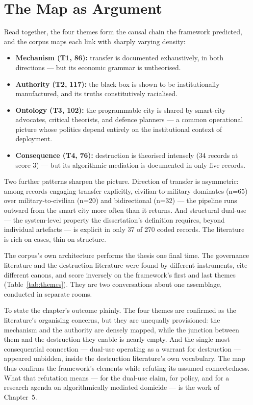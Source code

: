 \section{The Map as Argument}
\label{sec:map-as-argument}

Read together, the four themes form the causal chain the framework predicted, and the corpus maps each link with sharply varying density:

\begin{itemize}
\item \textbf{Mechanism (T1, 86):} transfer is documented exhaustively, in both directions — but its economic grammar is untheorised.
\item \textbf{Authority (T2, 117):} the black box is shown to be institutionally manufactured, and its truths constitutively racialised.
\item \textbf{Ontology (T3, 102):} the programmable city is shared by smart-city advocates, critical theorists, and defence planners — a common operational picture whose politics depend entirely on the institutional context of deployment.
\item \textbf{Consequence (T4, 76):} destruction is theorised intensely (34 records at score 3) — but its algorithmic mediation is documented in only five records.
\end{itemize}

Two further patterns sharpen the picture. Direction of transfer is asymmetric: among records engaging transfer explicitly, civilian-to-military dominates (n=65) over military-to-civilian (n=20) and bidirectional (n=32) — the pipeline runs outward from the smart city more often than it returns. And structural dual-use — the system-level property the dissertation's definition requires, beyond individual artefacts — is explicit in only 37 of 270 coded records. The literature is rich on cases, thin on structure.

The corpus's own architecture performs the thesis one final time. The governance literature and the destruction literature were found by different instruments, cite different canons, and score inversely on the framework's first and last themes (Table~\ref{tab:themes}). They are two conversations about one assemblage, conducted in separate rooms.

To state the chapter's outcome plainly. The four themes are confirmed as the literature's organising concerns, but they are unequally provisioned: the mechanism and the authority are densely mapped, while the junction between them and the destruction they enable is nearly empty. And the single most consequential connection — dual-use operating as a warrant for destruction — appeared unbidden, inside the destruction literature's own vocabulary. The map thus confirms the framework's elements while refuting its assumed connectedness. What that refutation means — for the dual-use claim, for policy, and for a research agenda on algorithmically mediated domicide — is the work of Chapter~5.
